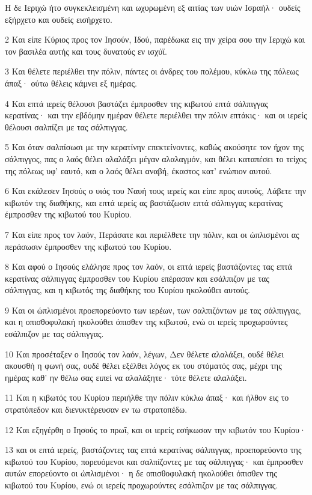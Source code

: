 \par Η δε Ιεριχώ ήτο συγκεκλεισμένη και ωχυρωμένη εξ αιτίας των υιών Ισραήλ· ουδείς εξήρχετο και ουδείς εισήρχετο.
\par 2 Και είπε Κύριος προς τον Ιησούν, Ιδού, παρέδωκα εις την χείρα σου την Ιεριχώ και τον βασιλέα αυτής και τους δυνατούς εν ισχύϊ.
\par 3 Και θέλετε περιέλθει την πόλιν, πάντες οι άνδρες του πολέμου, κύκλω της πόλεως άπαξ· ούτω θέλεις κάμνει εξ ημέρας.
\par 4 Και επτά ιερείς θέλουσι βαστάζει έμπροσθεν της κιβωτού επτά σάλπιγγας κερατίνας· και την εβδόμην ημέραν θέλετε περιέλθει την πόλιν επτάκις· και οι ιερείς θέλουσι σαλπίζει με τας σάλπιγγας.
\par 5 Και όταν σαλπίσωσι με την κερατίνην επεκτείνοντες, καθώς ακούσητε τον ήχον της σάλπιγγος, πας ο λαός θέλει αλαλάξει μέγαν αλαλαγμόν, και θέλει καταπέσει το τείχος της πόλεως υφ' εαυτό, και ο λαός θέλει αναβή, έκαστος κατ' ενώπιον αυτού.
\par 6 Και εκάλεσεν Ιησούς ο υιός του Ναυή τους ιερείς και είπε προς αυτούς, Λάβετε την κιβωτόν της διαθήκης, και επτά ιερείς ας βαστάζωσιν επτά σάλπιγγας κερατίνας έμπροσθεν της κιβωτού του Κυρίου.
\par 7 Και είπε προς τον λαόν, Περάσατε και περιέλθετε την πόλιν, και οι ώπλισμένοι ας περάσωσιν έμπροσθεν της κιβωτού του Κυρίου.
\par 8 Και αφού ο Ιησούς ελάλησε προς τον λαόν, οι επτά ιερείς βαστάζοντες τας επτά κερατίνας σάλπιγγας έμπροσθεν του Κυρίου επέρασαν και εσάλπιζον με τας σάλπιγγας, και η κιβωτός της διαθήκης του Κυρίου ηκολούθει αυτούς.
\par 9 Και οι ώπλισμένοι προεπορεύοντο των ιερέων, των σαλπιζόντων με τας σάλπιγγας, και η οπισθοφυλακή ηκολούθει όπισθεν της κιβωτού, ενώ οι ιερείς προχωρούντες εσάλπιζον με τας σάλπιγγας.
\par 10 Και προσέταξεν ο Ιησούς τον λαόν, λέγων, Δεν θέλετε αλαλάξει, ουδέ θέλει ακουσθή η φωνή σας, ουδέ θέλει εξέλθει λόγος εκ του στόματός σας, μέχρι της ημέρας καθ' ην θέλω σας ειπεί να αλαλάξητε· τότε θέλετε αλαλάξει.
\par 11 Και η κιβωτός του Κυρίου περιήλθε την πόλιν κύκλω άπαξ· και ήλθον εις το στρατόπεδον και διενυκτέρευσαν εν τω στρατοπέδω.
\par 12 Και εξηγέρθη ο Ιησούς το πρωΐ, και οι ιερείς εσήκωσαν την κιβωτόν του Κυρίου·
\par 13 και οι επτά ιερείς, βαστάζοντες τας επτά κερατίνας σάλπιγγας, προεπορεύοντο της κιβωτού του Κυρίου, πορευόμενοι και σαλπίζοντες με τας σάλπιγγας· και έμπροσθεν αυτών επορεύοντο οι ώπλισμένοι· η δε οπισθοφυλακή ηκολούθει όπισθεν της κιβωτού του Κυρίου, ενώ οι ιερείς προχωρούντες εσάλπιζον με τας σάλπιγγας.
